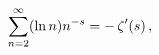 \[\sum_{n=2}^{\infty}(\mathop{\ln\/}\nolimits n)n^{-s}=-\mathop{\zeta\/}%
\nolimits'\!\left(s\right),\]